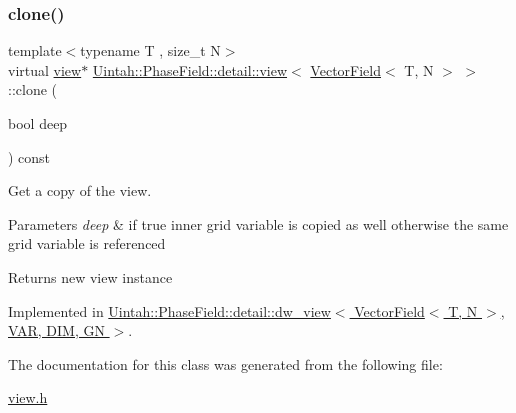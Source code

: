 \subsubsection{\texorpdfstring{clone()}{clone()}}
{\footnotesize\ttfamily template$<$typename T , size\+\_\+t N$>$ \\
virtual \hyperlink{classUintah_1_1PhaseField_1_1detail_1_1view}{view}$\ast$ \hyperlink{classUintah_1_1PhaseField_1_1detail_1_1view}{Uintah\+::\+Phase\+Field\+::detail\+::view}$<$ \hyperlink{structUintah_1_1PhaseField_1_1VectorField}{Vector\+Field}$<$ T, N $>$ $>$\+::clone (\begin{DoxyParamCaption}\item[{bool}]{deep }\end{DoxyParamCaption}) const\hspace{0.3cm}{\ttfamily [pure virtual]}}



Get a copy of the view. 


\begin{DoxyParams}{Parameters}
{\em deep} & if true inner grid variable is copied as well otherwise the same grid variable is referenced\\
\hline
\end{DoxyParams}
\begin{DoxyReturn}{Returns}
new view instance 
\end{DoxyReturn}


Implemented in \hyperlink{classUintah_1_1PhaseField_1_1detail_1_1dw__view_3_01VectorField_3_01T_00_01N_01_4_00_01VAR_00_01DIM_00_01GN_01_4_a3a7ade62eafad8e8db6d6072fb4ad38b}{Uintah\+::\+Phase\+Field\+::detail\+::dw\+\_\+view$<$ Vector\+Field$<$ T, N $>$, V\+A\+R, D\+I\+M, G\+N $>$}.



The documentation for this class was generated from the following file\+:\begin{DoxyCompactItemize}
\item 
\hyperlink{view_8h}{view.\+h}\end{DoxyCompactItemize}
